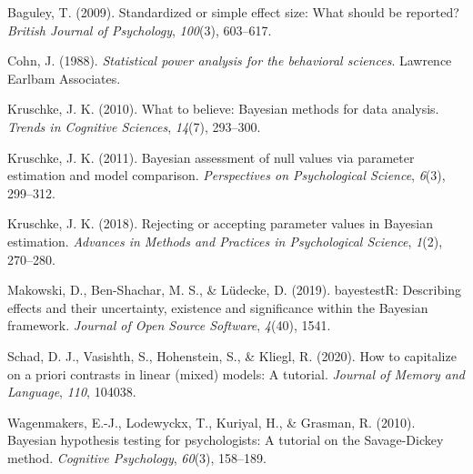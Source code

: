 \documentclass[
  english,
  man,floatsintext]{apa7}
\newlength{\cslhangindent}
\newenvironment{cslreferences}%
  {\setlength{\parindent}{0pt}%
  \everypar{\setlength{\hangindent}{\cslhangindent}}\ignorespaces}%
  {\par}
\begin{document}
\hypertarget{ref}{}

\endgroup

\hypertarget{refs}{}
\begin{cslreferences}
\leavevmode\hypertarget{ref-baguley2009standardized}{}%
Baguley, T. (2009). Standardized or simple effect size: What should be reported? \emph{British Journal of Psychology}, \emph{100}(3), 603--617.

\leavevmode\hypertarget{ref-cohn1988statistical}{}%
Cohn, J. (1988). \emph{Statistical power analysis for the behavioral sciences}. Lawrence Earlbam Associates.

\leavevmode\hypertarget{ref-kruschke2010believe}{}%
Kruschke, J. K. (2010). What to believe: Bayesian methods for data analysis. \emph{Trends in Cognitive Sciences}, \emph{14}(7), 293--300.

\leavevmode\hypertarget{ref-kruschke2011bayesian}{}%
Kruschke, J. K. (2011). Bayesian assessment of null values via parameter estimation and model comparison. \emph{Perspectives on Psychological Science}, \emph{6}(3), 299--312.

\leavevmode\hypertarget{ref-kruschke2018rejecting}{}%
Kruschke, J. K. (2018). Rejecting or accepting parameter values in Bayesian estimation. \emph{Advances in Methods and Practices in Psychological Science}, \emph{1}(2), 270--280.

\leavevmode\hypertarget{ref-makowski2019bayestestr}{}%
Makowski, D., Ben-Shachar, M. S., \& Lüdecke, D. (2019). bayestestR: Describing effects and their uncertainty, existence and significance within the Bayesian framework. \emph{Journal of Open Source Software}, \emph{4}(40), 1541.

\leavevmode\hypertarget{ref-schad2020capitalize}{}%
Schad, D. J., Vasishth, S., Hohenstein, S., \& Kliegl, R. (2020). How to capitalize on a priori contrasts in linear (mixed) models: A tutorial. \emph{Journal of Memory and Language}, \emph{110}, 104038.

\leavevmode\hypertarget{ref-wagenmakers2010bayesian}{}%
Wagenmakers, E.-J., Lodewyckx, T., Kuriyal, H., \& Grasman, R. (2010). Bayesian hypothesis testing for psychologists: A tutorial on the Savage-Dickey method. \emph{Cognitive Psychology}, \emph{60}(3), 158--189.
\end{cslreferences}
\end{document}
